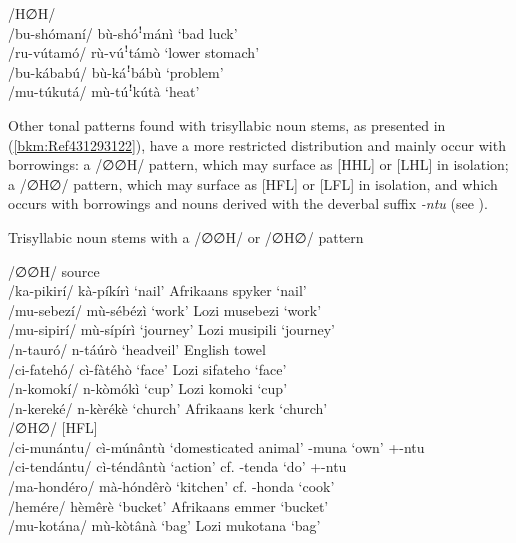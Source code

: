 /H∅H/ \tab [HꜝHL] \tab \\
/bu-shómaní/ \tab bù-shóꜝmánì \tab ‘bad luck’\\
/ru-vútamó/ \tab rù-vúꜝtámò \tab ‘lower stomach’\\
/bu-kábabú/ \tab bù-káꜝbábù \tab ‘problem’\\
/mu-túkutá/ \tab mù-túꜝkútà \tab ‘heat’\\
\z\largerpage

Other tonal patterns found with trisyllabic noun stems, as presented in (\ref{bkm:Ref431293122}), have a more restricted distribution and mainly occur with borrowings: a /∅∅H/ pattern, which may surface as [HHL] or [LHL] in isolation; a /∅H∅/ pattern, which may surface as [HFL] or [LFL] in isolation, and which occurs with borrowings and nouns derived with the deverbal suffix \textit{-ntu} (see ).

\ea
\label{bkm:Ref431293122}
  Trisyllabic noun stems with a /∅∅H/ or /∅H∅/ pattern

\ea /∅∅H/ \tab {[LHL] {\textasciitilde} [HHL]} \tab source\\
/ka-pikirí/ \tab kà-píkírì \tab ‘nail’ \tab Afrikaans spyker  ‘nail’\\
/mu-sebezí/ \tab mù-sébézì \tab ‘work’ \tab Lozi musebezi ‘work’\\
/mu-sipirí/ \tab mù-sípírì \tab ‘journey’ \tab Lozi musipili 
‘journey’\\
/n-tauró/ \tab n-táúrò \tab ‘headveil’ \tab English towel\\
/ci-fatehó/ \tab cì-fàtéhò \tab ‘face’ \tab Lozi sifateho ‘face’\\
/n-komokí/ \tab n-kòmókì \tab ‘cup’ \tab Lozi komoki ‘cup’\\
/n-kereké/ \tab n-kèrékè \tab ‘church’ \tab Afrikaans kerk 
‘church’\\
\ex /∅H∅/ \tab [LFL] {\textasciitilde} [HFL]\\
/ci-munántu/ \tab cì-múnântù \tab ‘domesticated animal’ \tab -muna ‘own’ +-ntu \\
/ci-tendántu/ \tab cì-téndântù \tab ‘action’ \tab cf. -tenda ‘do’ +-ntu \\
/ma-hondéro/ \tab mà-hóndêrò \tab ‘kitchen’ \tab cf. -honda ‘cook’\\
/hemére/ \tab hèmêrè \tab ‘bucket’ \tab Afrikaans emmer ‘bucket’\\
/mu-kotána/ \tab mù-kòtânà \tab ‘bag’ \tab Lozi mukotana ‘bag’\\
\z\z

